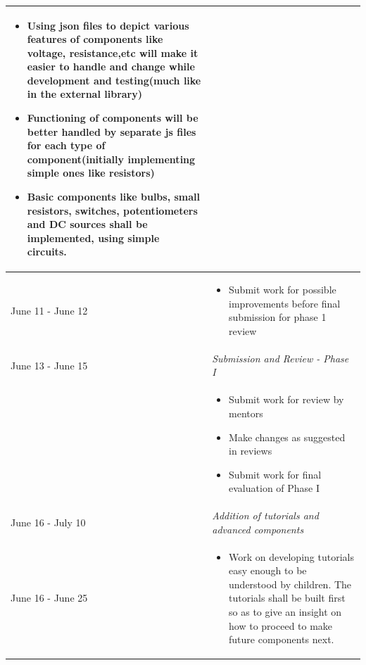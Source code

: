 \documentclass[preprint,12pt]{elsarticle}
\begin{document}
\begin{center}
\begin{tabularx}{\linewidth}{|l|X|}
{\begin{itemize}[noitemsep, topsep=2pt]
	\begin{itemize}[noitemsep, topsep=2pt]
		\item Using json files to depict various features of components like voltage, resistance,etc will make it easier to handle and change while development and testing(much like in the external library)
		
		\item Functioning of components will be better handled by separate js files for each type of component(initially implementing simple ones like resistors)
		
		\item Basic components like bulbs, small resistors, switches, potentiometers and DC sources shall be implemented, using simple circuits.
	\end{itemize}
\end{itemize}
}\\
\hline

{June 11 - June 12} & \par
\parbox{12cm}{
\begin{itemize}[noitemsep, topsep=2pt]
	\item Submit work for possible improvements before final submission for phase 1 review
\end{itemize}
}\\
\hline\hline

{June 13 - June 15} & {\textit{Submission and Review - Phase I
}}\\
\hline

 & \par
\parbox{12cm}{
\begin{itemize}[noitemsep, topsep=2pt]
	\item Submit work for review by mentors
	\item Make changes as suggested in reviews
	\item Submit work for final evaluation of Phase I
\end{itemize}
}\\
\hline\hline

{June 16 - July 10} & {\textit{Addition of tutorials and advanced components
}}\\
\hline

{June 16 - June 25} & \par
\parbox{12cm}{
\begin{itemize}[noitemsep, topsep=2pt]
	\item Work on developing tutorials easy enough to be understood by children. The tutorials shall be built first so as to give an insight on how to proceed to make future components next.


\end{itemize}}
\end{tabularx}
\end{center}
\end{document}
